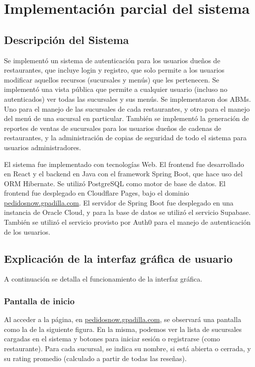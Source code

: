\section{Implementación parcial del sistema}

\subsection{Descripción del Sistema}

Se implementó un sistema de autenticación para los usuarios dueños de restaurantes, que incluye login y registro, que solo permite a los usuarios modificar aquellos recursos (sucursales y menús) que les pertenecen. Se implementó una vista pública que permite a cualquier usuario (incluso no autenticados) ver todas las sucursales y sus menús. Se implementaron dos ABMs. Uno para el manejo de las sucursales de cada restaurantes, y otro para el manejo del menú de una sucursal en particular. También se implementó la generación de reportes de ventas de sucursales para los usuarios dueños de cadenas de restaurantes, y la administración de copias de seguridad de todo el sistema para usuarios administradores.

El sistema fue implementado con tecnologías Web. El frontend fue desarrollado en React y el backend en Java con el framework Spring Boot, que hace uso del ORM Hibernate. Se utilizó PostgreSQL como motor de base de datos. El frontend fue desplegado en Cloudflare Pages, bajo el dominio \href{https://pedidosnow.gpadilla.com}{pedidosnow.gpadilla.com}. El servidor de Spring Boot fue desplegado en una instancia de Oracle Cloud, y para la base de datos se utilizó el servicio Supabase. También se utilizó el servicio provisto por Auth0 para el manejo de autenticación de los usuarios.

\subsection{Explicación de la interfaz gráfica de usuario}

A continuación se detalla el funcionamiento de la interfaz gráfica.

\subsubsection{Pantalla de inicio}

Al acceder a la página, en \href{https://pedidosnow.gpadilla.com}{pedidosnow.gpadilla.com}, se observará una pantalla como la de la siguiente figura. En la misma, podemos ver la lista de sucursales cargadas en el sistema y botones para iniciar sesión o registrarse (como restaurante). Para cada sucursal, se indica su nombre, si está abierta o cerrada, y su rating promedio (calculado a partir de todas las reseñas).

